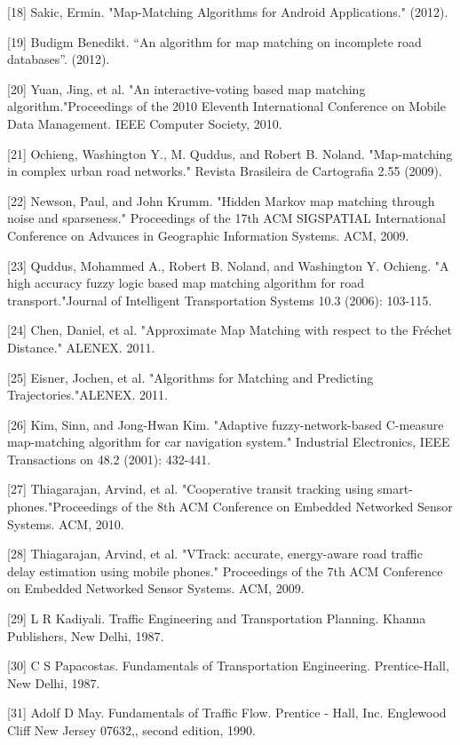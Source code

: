 \documentclass[final,fmstyle]{fpunathesis}
\begin{document}
[18] Sakic, Ermin. "Map-Matching Algorithms for Android Applications." (2012).

[19] Budigm Benedikt. “An algorithm for map matching on incomplete road databases”.  (2012).

[20] Yuan, Jing, et al. "An interactive-voting based map matching algorithm."Proceedings of the 2010 Eleventh International Conference on Mobile Data Management. IEEE Computer Society, 2010.

[21] Ochieng, Washington Y., M. Quddus, and Robert B. Noland. "Map-matching in complex urban road networks." Revista Brasileira de Cartografia 2.55 (2009).

[22] Newson, Paul, and John Krumm. "Hidden Markov map matching through noise and sparseness." Proceedings of the 17th ACM SIGSPATIAL International Conference on Advances in Geographic Information Systems. ACM, 2009.

[23] Quddus, Mohammed A., Robert B. Noland, and Washington Y. Ochieng. "A high accuracy fuzzy logic based map matching algorithm for road transport."Journal of Intelligent Transportation Systems 10.3 (2006): 103-115.

[24] Chen, Daniel, et al. "Approximate Map Matching with respect to the Fréchet Distance." ALENEX. 2011.

[25] Eisner, Jochen, et al. "Algorithms for Matching and Predicting Trajectories."ALENEX. 2011.

[26] Kim, Sinn, and Jong-Hwan Kim. "Adaptive fuzzy-network-based C-measure map-matching algorithm for car navigation system." Industrial Electronics, IEEE Transactions on 48.2 (2001): 432-441.

[27] Thiagarajan, Arvind, et al. "Cooperative transit tracking using smart-phones."Proceedings of the 8th ACM Conference on Embedded Networked Sensor Systems. ACM, 2010.

[28] Thiagarajan, Arvind, et al. "VTrack: accurate, energy-aware road traffic delay estimation using mobile phones." Proceedings of the 7th ACM Conference on Embedded Networked Sensor Systems. ACM, 2009.

[29] L R Kadiyali. Traffic Engineering and Transportation Planning. Khanna Publishers, New Delhi, 1987.

[30] C S Papacostas. Fundamentals of Transportation Engineering. Prentice-Hall, New Delhi, 1987.

[31] Adolf D May. Fundamentals of Traffic Flow. Prentice - Hall, Inc. Englewood Cliff New Jersey 07632,, second edition, 1990.
\end{document}
